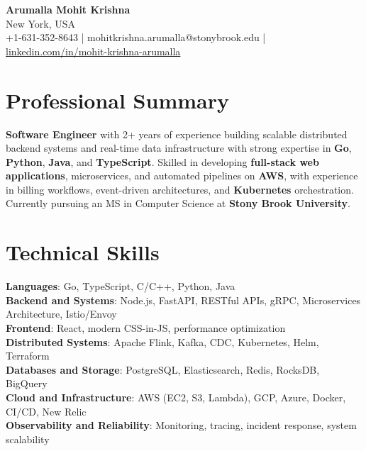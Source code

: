 \documentclass[letterpaper,11pt]{article}
\begin{document}
\begin{center}
  {\Large \textbf{Arumalla Mohit Krishna}} \\
  New York, USA \\
  +1-631-352-8643 \enspace | \enspace mohitkrishna.arumalla@stonybrook.edu \enspace | \enspace \href{https://www.linkedin.com/in/mohit-krishna-arumalla}{linkedin.com/in/mohit-krishna-arumalla}
\end{center}

\section{Professional Summary}
  \begin{itemize}[leftmargin=0.15in, label={}]
    \small{\item{
     \textbf{Software Engineer} with 2+ years of experience building scalable distributed backend systems and real-time data infrastructure with strong expertise in \textbf{Go}, \textbf{Python}, \textbf{Java}, and \textbf{TypeScript}. Skilled in developing \textbf{full-stack web applications}, microservices, and automated pipelines on \textbf{AWS}, with experience in billing workflows, event-driven architectures, and \textbf{Kubernetes} orchestration. Currently pursuing an MS in Computer Science at \textbf{Stony Brook University}.
    }}
  \end{itemize}
\vspace{-16pt}

\section{Technical Skills}
 \begin{itemize}[leftmargin=0.15in, label={}]
    \small{\item{
     \textbf{Languages}: Go, TypeScript, C/C++, Python, Java \\
     \textbf{Backend and Systems}: Node.js, FastAPI, RESTful APIs, gRPC, Microservices Architecture, Istio/Envoy \\
     \textbf{Frontend}: React, modern CSS-in-JS, performance optimization \\
     \textbf{Distributed Systems}: Apache Flink, Kafka, CDC, Kubernetes, Helm, Terraform \\
     \textbf{Databases and Storage}: PostgreSQL, Elasticsearch, Redis, RocksDB, BigQuery \\
     \textbf{Cloud and Infrastructure}: AWS (EC2, S3, Lambda), GCP, Azure, Docker, CI/CD, New Relic \\
     \textbf{Observability and Reliability}: Monitoring, tracing, incident response, system scalability
    }}
 \end{itemize}
\vspace{-16pt}
\end{document}
